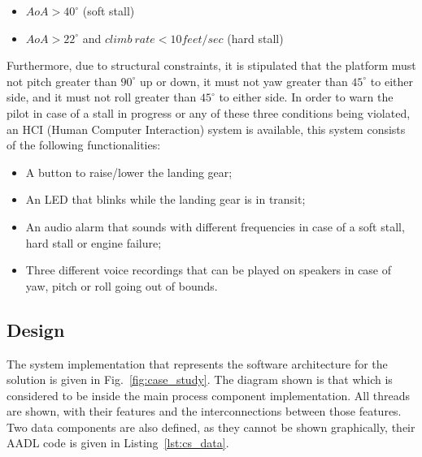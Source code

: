 \begin{itemize}
\item{$AoA > 40^\circ$ (soft stall)}
\item{$AoA > 22^\circ$ and $climb\ rate < 10 feet/sec$ (hard stall)}
\end{itemize}

Furthermore, due to structural constraints, it is stipulated that the
platform must not pitch greater than $90^\circ$ up or down, it must
not yaw greater than $45^\circ$ to either side, and it must not roll
greater than $45^\circ$ to either side. In order to warn the pilot in
case of a stall in progress or any of these three conditions being
violated, an HCI (Human Computer Interaction) system is available,
this system consists of the following functionalities:

\begin{itemize}
\item{A button to raise/lower the landing gear;}
\item{An LED that blinks while the landing gear is in transit;}
\item{An audio alarm that sounds with different frequencies in case of
  a soft stall, hard stall or engine failure;}
\item{Three different voice recordings that can be played on speakers
  in case of yaw, pitch or roll going out of bounds.}
\end{itemize}

\subsection{Design}
The system implementation that represents the software architecture
for the solution is given in Fig.~\ref{fig:case_study}. The diagram
shown is that which is considered to be inside the main process
component implementation. All threads are shown, with their features
and the interconnections between those features. Two data components
are also defined, as they cannot be shown graphically, their AADL code
is given in Listing~\ref{lst:cs_data}.

